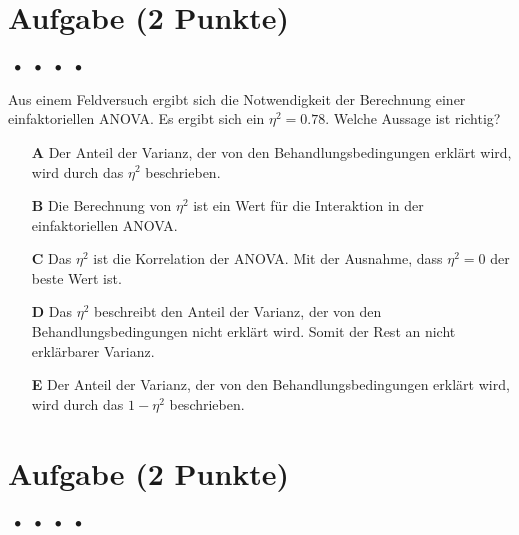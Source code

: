 \documentclass[a4paper, 9pt]{scrartcl}\usepackage[]{graphicx}\usepackage[]{xcolor}
\begin{document}
\section{Aufgabe \hfill (2 Punkte)}

\ifcollection
\begin{flushright}
\tiny\vspace{-2Ex}
\textbf{\examinhaltstart}
\exammodulemathstat $\;\bullet$
\exammodulestat $\;\bullet$
\exammodulestatbbv $\;\bullet$
\exammodulestatversuch $\;\bullet$
\exammodulebiostat
\vspace{-1Ex}
\end{flushright}
\fi






Aus einem Feldversuch ergibt sich die Notwendigkeit der Berechnung einer einfaktoriellen ANOVA. Es ergibt sich ein $\eta^2 = 0.78$. Welche Aussage ist richtig?



\begin{enumerate}
\item [\textbf{A} \msquare] Der Anteil der Varianz, der von den Behandlungsbedingungen erklärt wird, wird durch das $\eta^2$ beschrieben.
\item [\textbf{B} \msquare] Die Berechnung von $\eta^2$ ist ein Wert für die Interaktion in der einfaktoriellen ANOVA.
\item [\textbf{C} \msquare] Das $\eta^2$ ist die Korrelation der ANOVA. Mit der Ausnahme, dass $\eta^2 = 0$ der beste Wert ist.
\item [\textbf{D} \msquare] Das $\eta^2$ beschreibt den Anteil der Varianz, der von den Behandlungsbedingungen nicht erklärt wird. Somit der Rest an nicht erklärbarer Varianz.
\item [\textbf{E} \msquare] Der Anteil der Varianz, der von den Behandlungsbedingungen erklärt wird, wird durch das $1-\eta^2$ beschrieben.
\end{enumerate}

\section{Aufgabe \hfill (2 Punkte)}

\ifcollection
\begin{flushright}
\tiny\vspace{-2Ex}
\textbf{\examinhaltstart}
\exammodulemathstat $\;\bullet$
\exammodulestat $\;\bullet$
\exammodulestatbbv $\;\bullet$
\exammodulestatversuch $\;\bullet$
\exammodulebiostat
\vspace{-1Ex}
\end{flushright}
\fi
\end{document}
